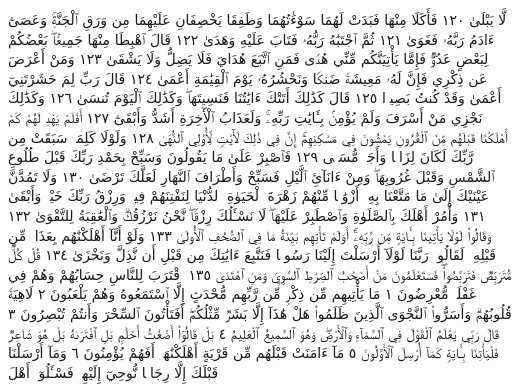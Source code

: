 لَّا يَبْلَىٰ ١٢٠ فَأَكَلَا مِنْهَا فَبَدَتْ لَهُمَا سَوْءَٰتُهُمَا وَطَفِقَا
يَخْصِفَانِ عَلَيْهِمَا مِن وَرَقِ ٱلْجَنَّةِۚ وَعَصَىٰٓ ءَادَمُ رَبَّهُۥ فَغَوَىٰ ١٢١
ثُمَّ ٱجْتَبَٰهُ رَبُّهُۥ فَتَابَ عَلَيْهِ وَهَدَىٰ ١٢٢ قَالَ ٱهْبِطَا مِنْهَا
جَمِيعَۢاۖ بَعْضُكُمْ لِبَعْضٍ عَدُوࣱّۖ فَإِمَّا يَأْتِيَنَّكُم مِّنِّي هُدࣰى
فَمَنِ ٱتَّبَعَ هُدَايَ فَلَا يَضِلُّ وَلَا يَشْقَىٰ ١٢٣ وَمَنْ أَعْرَضَ
عَن ذِكْرِي فَإِنَّ لَهُۥ مَعِيشَةࣰ ضَنكࣰا وَنَحْشُرُهُۥ يَوْمَ ٱلْقِيَٰمَةِ
أَعْمَىٰ ١٢٤ قَالَ رَبِّ لِمَ حَشَرْتَنِيٓ أَعْمَىٰ وَقَدْ كُنتُ بَصِيرࣰا ١٢٥
قَالَ كَذَٰلِكَ أَتَتْكَ ءَايَٰتُنَا فَنَسِيتَهَاۖ وَكَذَٰلِكَ ٱلْيَوْمَ تُنسَىٰ ١٢٦
وَكَذَٰلِكَ نَجْزِي مَنْ أَسْرَفَ وَلَمْ يُؤْمِنۢ بِـَٔايَٰتِ رَبِّهِۦۚ وَلَعَذَابُ ٱلْأٓخِرَةِ
أَشَدُّ وَأَبْقَىٰٓ ١٢٧ أَفَلَمْ يَهْدِ لَهُمْ كَمْ أَهْلَكْنَا قَبْلَهُم مِّنَ ٱلْقُرُونِ
يَمْشُونَ فِي مَسَٰكِنِهِمْۚ إِنَّ فِي ذَٰلِكَ لَأٓيَٰتࣲ لِّأُو۟لِي ٱلنُّهَىٰ ١٢٨
وَلَوْلَا كَلِمَةࣱ سَبَقَتْ مِن رَّبِّكَ لَكَانَ لِزَامࣰا وَأَجَلࣱ مُّسَمࣰّى ١٢٩
فَٱصْبِرْ عَلَىٰ مَا يَقُولُونَ وَسَبِّحْ بِحَمْدِ رَبِّكَ قَبْلَ طُلُوعِ ٱلشَّمْسِ
وَقَبْلَ غُرُوبِهَاۖ وَمِنْ ءَانَآئِ ٱلَّيْلِ فَسَبِّحْ وَأَطْرَافَ ٱلنَّهَارِ لَعَلَّكَ
تَرْضَىٰ ١٣٠ وَلَا تَمُدَّنَّ عَيْنَيْكَ إِلَىٰ مَا مَتَّعْنَا بِهِۦٓ أَزْوَٰجࣰا مِّنْهُمْ زَهْرَةَ
ٱلْحَيَوٰةِ ٱلدُّنْيَا لِنَفْتِنَهُمْ فِيهِۚ وَرِزْقُ رَبِّكَ خَيْرࣱ وَأَبْقَىٰ ١٣١ وَأْمُرْ أَهْلَكَ
بِٱلصَّلَوٰةِ وَٱصْطَبِرْ عَلَيْهَاۖ لَا نَسْـَٔلُكَ رِزْقࣰاۖ نَّحْنُ نَرْزُقُكَۗ وَٱلْعَٰقِبَةُ
لِلتَّقْوَىٰ ١٣٢ وَقَالُوا۟ لَوْلَا يَأْتِينَا بِـَٔايَةࣲ مِّن رَّبِّهِۦٓۚ أَوَلَمْ تَأْتِهِم
بَيِّنَةُ مَا فِي ٱلصُّحُفِ ٱلْأُولَىٰ ١٣٣ وَلَوْ أَنَّآ أَهْلَكْنَٰهُم بِعَذَابࣲ
مِّن قَبْلِهِۦ لَقَالُوا۟ رَبَّنَا لَوْلَآ أَرْسَلْتَ إِلَيْنَا رَسُولࣰا فَنَتَّبِعَ
ءَايَٰتِكَ مِن قَبْلِ أَن نَّذِلَّ وَنَخْزَىٰ ١٣٤ قُلْ كُلࣱّ مُّتَرَبِّصࣱ فَتَرَبَّصُوا۟ۖ
فَسَتَعْلَمُونَ مَنْ أَصْحَٰبُ ٱلصِّرَٰطِ ٱلسَّوِيِّ وَمَنِ ٱهْتَدَىٰ ١٣٥
ٱقْتَرَبَ لِلنَّاسِ حِسَابُهُمْ وَهُمْ فِي غَفْلَةࣲ مُّعْرِضُونَ ١
مَا يَأْتِيهِم مِّن ذِكْرࣲ مِّن رَّبِّهِم مُّحْدَثٍ إِلَّا ٱسْتَمَعُوهُ وَهُمْ
يَلْعَبُونَ ٢ لَاهِيَةࣰ قُلُوبُهُمْۗ وَأَسَرُّوا۟ ٱلنَّجْوَى ٱلَّذِينَ
ظَلَمُوا۟ هَلْ هَٰذَآ إِلَّا بَشَرࣱ مِّثْلُكُمْۖ أَفَتَأْتُونَ ٱلسِّحْرَ وَأَنتُمْ
تُبْصِرُونَ ٣ قَالَ رَبِّي يَعْلَمُ ٱلْقَوْلَ فِي ٱلسَّمَآءِ وَٱلْأَرْضِۖ
وَهُوَ ٱلسَّمِيعُ ٱلْعَلِيمُ ٤ بَلْ قَالُوٓا۟ أَضْغَٰثُ أَحْلَٰمِۭ بَلِ
ٱفْتَرَىٰهُ بَلْ هُوَ شَاعِرࣱ فَلْيَأْتِنَا بِـَٔايَةࣲ كَمَآ أُرْسِلَ ٱلْأَوَّلُونَ ٥
مَآ ءَامَنَتْ قَبْلَهُم مِّن قَرْيَةٍ أَهْلَكْنَٰهَآۖ أَفَهُمْ يُؤْمِنُونَ ٦
وَمَآ أَرْسَلْنَا قَبْلَكَ إِلَّا رِجَالࣰا نُّوحِيٓ إِلَيْهِمْۖ فَسْـَٔلُوٓا۟ أَهْلَ
